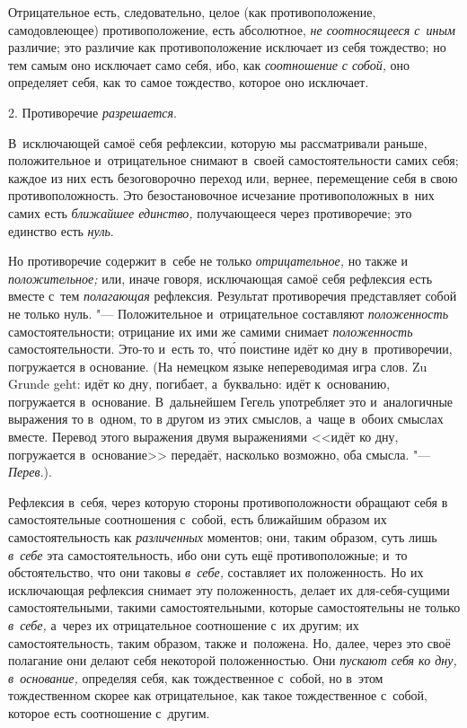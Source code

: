 Отрицательное есть, следовательно, целое (как противоположение,
самодовлеющее) противоположение, есть абсолютное,
{\em не соотносящееся с~иным} различие; это различие
как противоположение исключает из себя тождество; но тем самым оно
исключает само себя, ибо, как {\em соотношение с
собой,} оно определяет себя, как то самое тождество, которое оно исключает.


\bigskip

2. Противоречие {\em разрешается}.

В~исключающей самоё себя рефлексии, которую мы рассматривали раньше,
положительное и~отрицательное снимают в~своей самостоятельности самих себя;
каждое из них есть безоговорочно переход или, вернее, перемещение себя в
свою противоположность. Это безостановочное исчезание противоположных в~них
самих есть {\em ближайшее единство,} получающееся через
противоречие; это единство есть {\em нуль}.

Но противоречие содержит в~себе не только {\em отрицательное,} но также и
{\em положительное;} или, иначе говоря, исключающая
самоё себя рефлексия есть вместе с~тем {\em полагающая}
рефлексия. Результат противоречия представляет собой не только нуль. "---
Положительное и~отрицательное составляют
{\em положенность} самостоятельности; отрицание их ими
же самими снимает {\em положенность} самостоятельности.
Это-то и~есть то, чт\'{о} поистине идёт ко дну в~противоречии, погружается в
основание. (На немецком языке непереводимая игра слов. Zu Grunde geht: идёт
ко дну, погибает, а~буквально: идёт к~основанию, погружается в~основание.
В~дальнейшем Гегель употребляет это и~аналогичные выражения то в~одном, то в
другом из этих смыслов, а~чаще в~обоих смыслах вместе. Перевод этого
выражения двумя выражениями <<идёт ко дну, погружается в~основание>>
передаёт, насколько возможно, оба смысла. "---
{\em Перев}.).

Рефлексия в~себя, через которую стороны противоположности обращают себя в
самостоятельные соотношения с~собой, есть ближайшим образом их
самостоятельность как {\em различенных} моментов; они,
таким образом, суть лишь {\em в~себе} эта
самостоятельность, ибо они суть ещё противоположные; и~то обстоятельство,
что они таковы {\em в~себе,} составляет их
положенность. Но их исключающая рефлексия снимает эту положенность, делает
их для-себя-сущими самостоятельными, такими самостоятельными, которые
самостоятельны не только {\em в~себе,} а~через их
отрицательное соотношение с~их другим; их самостоятельность, таким образом,
также и~положена. Но, далее, через это своё полагание они делают себя
некоторой положенностью. Они {\em пускают себя ко дну,
в~основание,} определяя себя, как тождественное с~собой, но в~этом
тождественном скорее как отрицательное, как такое тождественное с~собой,
которое есть соотношение с~другим.

